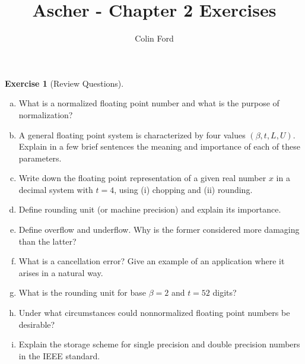 \documentclass[12pt,a4]{article}
\author{Colin Ford}
\title{Ascher - Chapter 2 Exercises}
\date{}
\theoremstyle{definition}
\newtheorem{exercise}{Exercise}
\begin{document}
\maketitle

\begin{exercise}[Review Questions]
	\begin{enumerate}[(a)]
		\item What is a normalized floating point number and what is the purpose of normalization?
		
		\item A general floating point system is characterized by four values $(\beta, t, L, U)$. Explain in a few brief sentences the meaning and importance of each of these parameters.
		
		\item Write down the floating point representation of a given real number $x$ in a decimal system with $t = 4$, using (i) chopping and (ii) rounding.
		
		\item Define rounding unit (or machine precision) and explain its importance.
		
		\item Define overflow and underflow. Why is the former considered more damaging than the latter?
		
		\item What is a cancellation error? Give an example of an application where it arises in a natural way.
		
		\item What is the rounding unit for base $\beta = 2$ and $t = 52$ digits?
		
		\item Under what circumstances could nonnormalized floating point numbers be desirable?
		
		\item Explain the storage scheme for single precision and double precision numbers in the IEEE standard.
		
	\end{enumerate}
\end{exercise}
\end{document}
